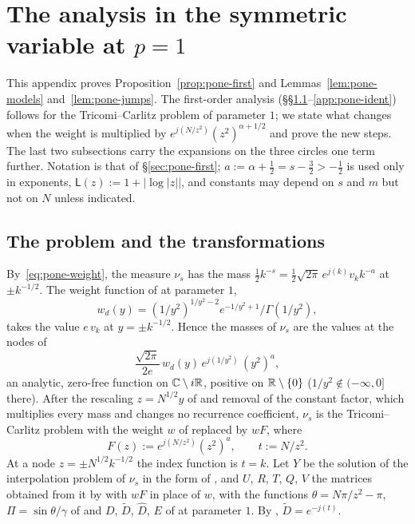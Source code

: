 
\section{\texorpdfstring{The analysis in the symmetric variable at $p=1$}{The analysis in the symmetric variable at p=1}}\label{app:pone}

This appendix proves Proposition~\ref{prop:pone-first} and Lemmas~\ref{lem:pone-models} and~\ref{lem:pone-jumps}. The
first-order analysis (\S\S\ref{app:pone-setup}--\ref{app:pone-ident}) follows \cite[\S\S3--6]{WLXZ} for the
Tricomi--Carlitz problem of parameter $1$; we state what changes when the weight is multiplied by
$e^{j(N/z^2)}(z^2)^{\alpha+1/2}$ and prove the new steps. The last two subsections carry the expansions on the three
circles one term further. Notation is that of \S\ref{sec:pone-first}; $a:=\alpha+\frac12=s-\frac32>-\frac12$ is used only
in exponents, $\mathsf L(z):=1+|\log|z||$, and constants may depend on $s$ and $m$ but not on $N$ unless indicated.

\subsection{The problem and the transformations}\label{app:pone-setup}

By~\eqref{eq:pone-weight}, the measure $\nu_s$ has the mass
$\frac12k^{-s}=\frac12\sqrt{2\pi}\,e^{j(k)}v_kk^{-a}$ at $\pm k^{-1/2}$. The
weight function of \cite[(2.15)]{WLXZ} at parameter $1$,
\[
  w_d(y)=(1/y^2)^{1/y^2-2}e^{-1/y^2+1}/\Gamma(1/y^2),
\]
takes the value $e\,v_k$ at $y=\pm k^{-1/2}$. Hence the masses of $\nu_s$ are the values at the nodes of
\[
  \frac{\sqrt{2\pi}}{2e}\,w_d(y)\,e^{j(1/y^2)}\,(y^2)^{a},
\]
an analytic, zero-free function on $\mathbb{C}\setminus i\mathbb{R}$, positive on $\mathbb{R}\setminus\{0\}$ ($1/y^2\notin(-\infty,0]$ there). After
the rescaling $z=N^{1/2}y$ of \cite[(3.1), (3.4)]{WLXZ} and removal of the constant factor, which multiplies every mass
and changes no recurrence coefficient, $\nu_s$ is the Tricomi--Carlitz problem with the weight $w$ of \cite[(3.4)]{WLXZ}
replaced by $wF$, where
\[
  F(z):=e^{j(N/z^2)}(z^2)^a,\qquad t:=N/z^2 .
\]
At a node $z=\pm N^{1/2}k^{-1/2}$ the index function is $t=k$. Let $Y$ be the solution of the interpolation problem of
$\nu_s$ in the form of \cite[(2.14), Theorem~2.3]{WLXZ}, and $U$, $R$, $T$, $Q$, $V$ the matrices obtained from it by
\cite[(3.1), (3.9)--(3.12), (3.15), (4.1), (4.12), (5.1)]{WLXZ} with $wF$ in place of $w$, with the functions
$\theta=N\pi/z^2-\pi$, $\Pi=\sin\theta/\gamma$ of \cite[(3.6)--(3.7)]{WLXZ} and $D$, $\tilde D$, $\hat D$, $E$ of
\cite[(4.14)--(4.20), (4.22)]{WLXZ} at parameter $1$. By \cite[(4.15)]{WLXZ}, $\tilde D=e^{-j(t)}$.

